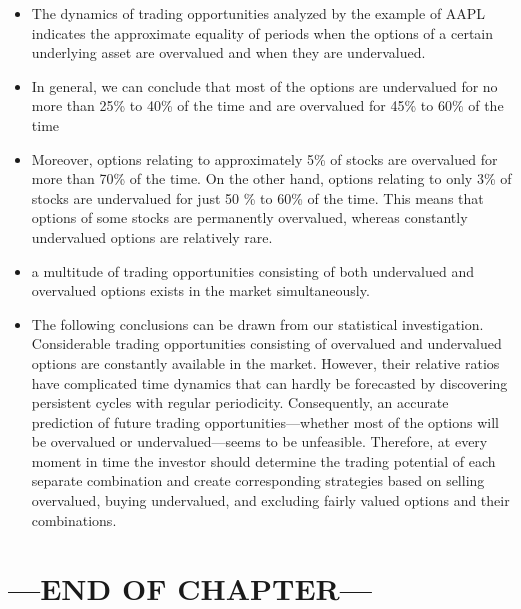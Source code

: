 \begin{itemize}
            \item The dynamics of trading opportunities analyzed by the example of AAPL indicates the approximate equality of periods when the options of a certain underlying asset are overvalued and when they are undervalued.
            \item In general, we can conclude that most of the options are undervalued for no more than 25\% to 40\% of the time and are overvalued for 45\% to 60\% of the time
            \item  Moreover, options relating to approximately 5\% of stocks are overvalued for more than 70\% of the time. On the other hand, options relating to only 3\% of stocks are undervalued for just 50 \% to 60\% of the time. This means that options of some stocks are permanently overvalued, whereas constantly undervalued options are relatively rare.
            \item a multitude of trading opportunities consisting of both undervalued and overvalued options exists in the market simultaneously.
            \item The following conclusions can be drawn from our statistical investigation.
                \subitem Considerable trading opportunities consisting of overvalued and undervalued options are constantly available in the market. However, their relative ratios have complicated time dynamics that can hardly be forecasted by discovering persistent cycles with regular periodicity.  Consequently, an accurate prediction of future trading opportunities—whether most of the options will be overvalued or undervalued—seems to be unfeasible.
                \subitem Therefore, at every moment in time the investor should determine the trading potential of each separate combination and create corresponding strategies based on selling overvalued, buying undervalued, and excluding fairly valued options and their combinations.
        \end{itemize}

    \section*{\centering ---END OF CHAPTER---}




